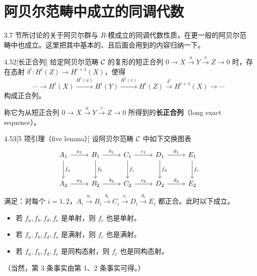 \section{阿贝尔范畴中成立的同调代数}

3.7 节所讨论的关于阿贝尔群与 $R$-模成立的同调代数性质，在更一般的阿贝尔范畴中也成立。这里把其中基本的、且后面会用到的内容归纳一下。

\begin{lemma}{4.52}[长正合列]
给定阿贝尔范畴 $\mathcal{C}$ 的复形的短正合列 $0\to X\xrightarrow{u}Y\xrightarrow{v}Z\to 0$ 时，存在态射 $\delta^i\colon H^i(Z)\to H^{i+1}(X)$，使得
\[ \cdots\to H^i(X)\xrightarrow{H^i(u)}H^i(Y)\xrightarrow{H^i(v)}H^i(Z)\xrightarrow{\ \delta^i\ }H^{i+1}(X)\to\cdots \]
构成正合列。
\end{lemma}

称它为从短正合列 $0\to X\xrightarrow{u}Y\xrightarrow{v}Z\to 0$ 所得到的\textbf{长正合列}（long exact sequence）。

\begin{lemma}{4.53}[5 项引理（five lemma）]
设阿贝尔范畴 $\mathcal{C}$ 中如下交换图表
\[\begin{tikzcd}[row sep=2.6em, column sep=2.6em]
  A_1 \arrow[r,"a_1"] \arrow[d,"f_a"] & B_1 \arrow[r,"b_1"] \arrow[d,"f_b"] & C_1 \arrow[r,"c_1"] \arrow[d,"f_c"] & D_1 \arrow[r,"d_1"] \arrow[d,"f_d"] & E_1 \arrow[d,"f_e"] \\
  A_2 \arrow[r,"a_2"] & B_2 \arrow[r,"b_2"] & C_2 \arrow[r,"c_2"] & D_2 \arrow[r,"d_2"] & E_2
\end{tikzcd}\]
满足：对每个 $i=1,2$，$A_i\xrightarrow{a_i}B_i\xrightarrow{b_i}C_i\xrightarrow{c_i}D_i\xrightarrow{d_i}E_i$ 都正合。此时以下成立。
\begin{itemize}
  \item 若 $f_a,f_b,f_d,f_e$ 是单射，则 $f_c$ 也是单射。
  \item 若 $f_a,f_b,f_d,f_e$ 是满射，则 $f_c$ 也是满射。
  \item 若 $f_a,f_b,f_d,f_e$ 是同构态射，则 $f_c$ 也是同构态射。
\end{itemize}
（当然，第 3 条事实由第 1、2 条事实可得。）
\end{lemma}

